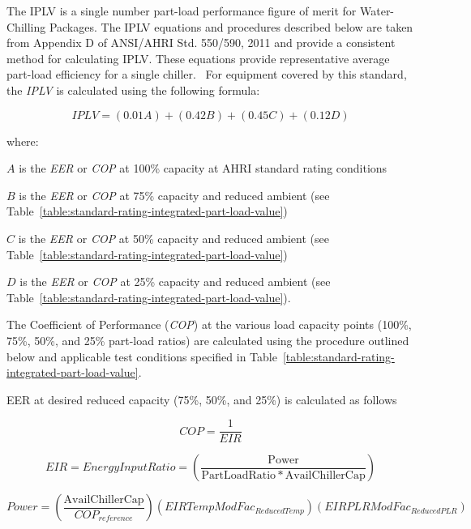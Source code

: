 The IPLV is a single number part-load performance figure of merit for Water-Chilling Packages. The IPLV equations and procedures described below are taken from Appendix D of ANSI/AHRI Std. 550/590, 2011 and provide a consistent method for calculating IPLV. These equations provide representative average part-load efficiency for a single chiller. ~For equipment covered by this standard, the \emph{IPLV} is calculated using the following formula:

\begin{equation}
IPLV = (0.01A) + (0.42B) + (0.45C) + (0.12D)
\end{equation}

where:

\(A\) is the \emph{EER} or \emph{COP} at 100\% capacity at AHRI standard rating conditions

\(B\) is the \emph{EER} or \emph{COP} at 75\% capacity and reduced ambient (see Table~\ref{table:standard-rating-integrated-part-load-value})

\(C\) is the \emph{EER} or \emph{COP} at 50\% capacity and reduced ambient (see Table~\ref{table:standard-rating-integrated-part-load-value})

\(D\) is the \emph{EER} or \emph{COP} at 25\% capacity and reduced ambient (see Table~\ref{table:standard-rating-integrated-part-load-value}).

The Coefficient of Performance (\emph{COP}) at the various load capacity points (100\%, 75\%, 50\%, and 25\% part-load ratios) are calculated using the procedure outlined below and applicable test conditions specified in Table~\ref{table:standard-rating-integrated-part-load-value}.

EER at desired reduced capacity (75\%, 50\%, and 25\%) is calculated as follows

\begin{equation}
COP = \frac{{\mathrm{1}}}{{EIR}}
\end{equation}

\begin{equation}
EIR = EnergyInputRatio = \left( {\frac{{{\mathrm{Power }}}}{{{\mathrm{PartLoadRatio * AvailChillerCap}}}}} \right)
\end{equation}

\begin{equation}
Power = \left( {\frac{{{\mathrm{AvailChillerCap}}}}{{CO{P_{reference}}}}} \right)(EIRTempModFa{c_{ReducedTemp}})(EIRPLRModFa{c_{ReducedPLR}})
\end{equation}

